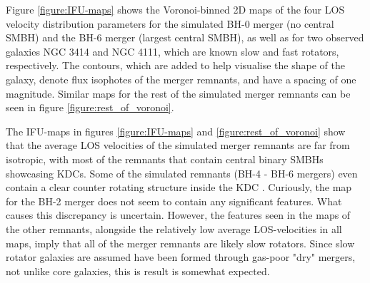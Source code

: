 \documentclass[english, twoside]{HYgradu}
\begin{document}
Figure \ref{figure:IFU-maps} shows the Voronoi-binned 2D maps of the four LOS velocity distribution parameters for the simulated BH-0 merger (no central SMBH) and the BH-6 merger (largest central SMBH), as well as for two observed galaxies NGC 3414 and NGC 4111, which are known slow and fast rotators, respectively. The contours, which are added to help visualise the shape of the galaxy, denote flux isophotes of the merger remnants, and have a spacing of one magnitude. Similar maps for the rest of the simulated merger remnants can be seen in figure \ref{figure:rest_of_voronoi}.

The IFU-maps in figures \ref{figure:IFU-maps} and \ref{figure:rest_of_voronoi} show that the average LOS velocities of the simulated merger remnants are far from isotropic, with most of the remnants that contain central binary SMBHs showcasing KDCs. Some of the simulated remnants (BH-4 - BH-6 mergers) even contain a clear counter rotating structure inside the KDC \citep{Rantala2019}. Curiously, the map for the BH-2 merger does not seem to contain any significant features. What causes this discrepancy is uncertain. However, the features seen in the maps of the other remnants, alongside the relatively low average LOS-velocities in all maps, imply that all of the merger remnants are likely slow rotators. Since slow rotator galaxies are assumed have been formed through gas-poor "dry" mergers, not unlike core galaxies, this is result is somewhat expected.
\end{document}
